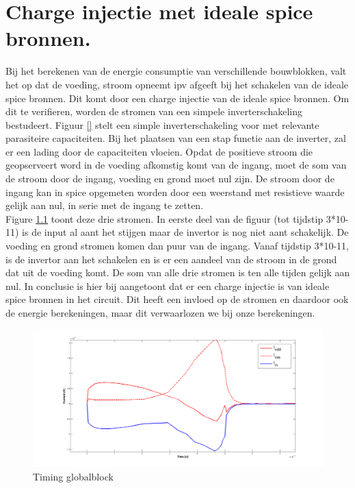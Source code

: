 \chapter{Charge injectie met ideale spice bronnen.}
\label{app:chargeinj}
Bij het berekenen van de energie consumptie van verschillende bouwblokken, valt het op dat de voeding, stroom opneemt ipv afgeeft bij het schakelen van de ideale spice bronnen. Dit komt door een charge injectie van de ideale spice bronnen. Om dit te verifieren, worden de stromen van een simpele inverterschakeling bestudeert. Figuur \ref{} stelt een simple inverterschakeling voor met relevante parasiteire capaciteiten. Bij het plaatsen van een stap functie aan de inverter, zal er een lading door de capaciteiten vloeien. Opdat de positieve stroom die geopserveert word in de voeding afkomstig komt van de ingang, moet de som van de stroom door de ingang, voeding en grond moet nul zijn. De stroom door de ingang kan in spice opgemeten worden door een weerstand met resistieve waarde gelijk aan nul, in serie met de ingang te zetten.\\
Figure \ref{fig:chargeinj_cur} toont deze drie stromen. In eerste deel van de figuur (tot tijdstip 3*10-11) is de input al aant het stijgen maar de invertor is nog niet aant schakelijk. De voeding en grond stromen komen dan puur van de ingang. Vanaf tijdstip 3*10-11, is de invertor aan het schakelen en is er een aandeel van de stroom in de grond dat uit de voeding komt. De som van alle drie stromen is ten alle tijden gelijk aan nul.
In conclusie is hier bij aangetoont dat er een charge injectie is van ideale spice bronnen in het circuit. Dit heeft een invloed op de stromen en daardoor ook de energie berekeningen, maar dit verwaarlozen we bij onze berekeningen.


\begin{figure}[h!]
  \centering
  \includegraphics[width=\textwidth]{../fig/hfdst-chargeinj-currents.png}
  \caption{Timing globalblock}
  \label{fig:chargeinj_cur}
\end{figure}